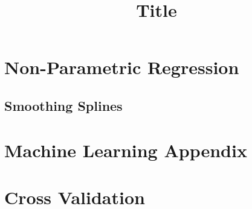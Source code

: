 \documentclass[
fourColumns,
landscape
]{formularyETH/formularyETH}
\title{Title}
\begin{document}

\section{Non-Parametric Regression}\label{sec:non-parametric_regression}
  
  \subsection{Smoothing Splines}\label{subsec:smoothing_splines}
    



\newpage
{}
\section*{Machine Learning Appendix}\label{sec:ml_appendix}
  
\newpage
{}

\newpage

\section{Cross Validation}\label{sec:cross_validation}
    

\end{document}

